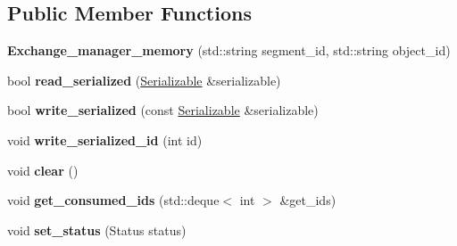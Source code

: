 \subsection*{Public Member Functions}
\begin{DoxyCompactItemize}
\item 
{\bfseries Exchange\+\_\+manager\+\_\+memory} (std\+::string segment\+\_\+id, std\+::string object\+\_\+id)\hypertarget{classshared__memory_1_1internal_1_1Exchange__manager__memory_a4bb976aa1b16314bf4181035bb746869}{}\label{classshared__memory_1_1internal_1_1Exchange__manager__memory_a4bb976aa1b16314bf4181035bb746869}

\item 
bool {\bfseries read\+\_\+serialized} (\hyperlink{classSerializable}{Serializable} \&serializable)\hypertarget{classshared__memory_1_1internal_1_1Exchange__manager__memory_aa0efbb57f5fafc8faa52f112b4db705e}{}\label{classshared__memory_1_1internal_1_1Exchange__manager__memory_aa0efbb57f5fafc8faa52f112b4db705e}

\item 
bool {\bfseries write\+\_\+serialized} (const \hyperlink{classSerializable}{Serializable} \&serializable)\hypertarget{classshared__memory_1_1internal_1_1Exchange__manager__memory_a4b5fddf9270c80e4fbcb041947b4142c}{}\label{classshared__memory_1_1internal_1_1Exchange__manager__memory_a4b5fddf9270c80e4fbcb041947b4142c}

\item 
void {\bfseries write\+\_\+serialized\+\_\+id} (int id)\hypertarget{classshared__memory_1_1internal_1_1Exchange__manager__memory_a89d6cea01eca5ba87bff929e6bc7049f}{}\label{classshared__memory_1_1internal_1_1Exchange__manager__memory_a89d6cea01eca5ba87bff929e6bc7049f}

\item 
void {\bfseries clear} ()\hypertarget{classshared__memory_1_1internal_1_1Exchange__manager__memory_ae9babbca9b477db799c6bbfe3aab425b}{}\label{classshared__memory_1_1internal_1_1Exchange__manager__memory_ae9babbca9b477db799c6bbfe3aab425b}

\item 
void {\bfseries get\+\_\+consumed\+\_\+ids} (std\+::deque$<$ int $>$ \&get\+\_\+ids)\hypertarget{classshared__memory_1_1internal_1_1Exchange__manager__memory_a166fd53fb2da0da38801138ff1119e4c}{}\label{classshared__memory_1_1internal_1_1Exchange__manager__memory_a166fd53fb2da0da38801138ff1119e4c}

\item 
void {\bfseries set\+\_\+status} (Status status)\hypertarget{classshared__memory_1_1internal_1_1Exchange__manager__memory_a9294652f5d187c25308fc185107405ce}{}\label{classshared__memory_1_1internal_1_1Exchange__manager__memory_a9294652f5d187c25308fc185107405ce}


\end{DoxyCompactItemize}
